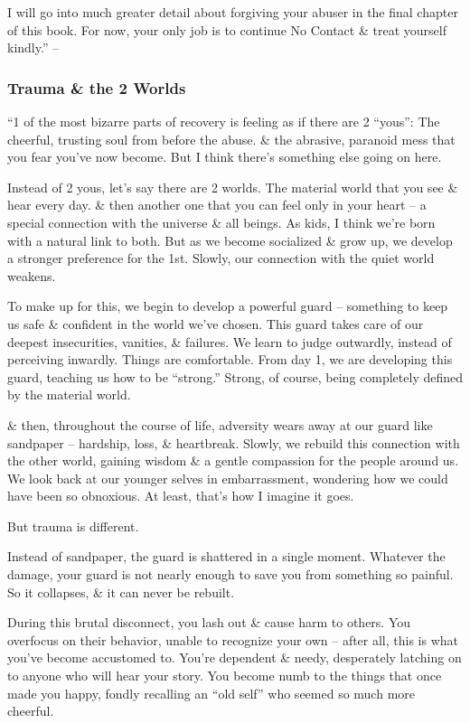 \documentclass{article}
\numberwithin{equation}{section}
\begin{document}
I will go into much greater detail about forgiving your abuser in the final chapter of this book. For now, your only job is to continue No Contact \& treat yourself kindly.'' -- \cite[pp. 133--134]{MacKenzie2015}

\subsubsection{Trauma \& the 2 Worlds}
``1 of the most bizarre parts of recovery is feeling as if there are 2 ``yous'': The cheerful, trusting soul from before the abuse. \& the abrasive, paranoid mess that you fear you've now become. But I think there's something else going on here.

Instead of 2 yous, let's say there are 2 worlds. The material world that you see \& hear every day. \& then another one that you can feel only in your heart -- a special connection with the universe \& all beings. As kids, I think we're born with a natural link to both. But as we become socialized \& grow up, we develop a stronger preference for the 1st. Slowly, our connection with the quiet world weakens.

To make up for this, we begin to develop a powerful guard -- something to keep us safe \& confident in the world we've chosen. This guard takes care of our deepest insecurities, vanities, \& failures. We learn to judge outwardly, instead of perceiving inwardly. Things are comfortable. From day 1, we are developing this guard, teaching us how to be ``strong.'' Strong, of course, being completely defined by the material world.

\& then, throughout the course of life, adversity wears away at our guard like sandpaper -- hardship, loss, \& heartbreak. Slowly, we rebuild this connection with the other world, gaining wisdom \& a gentle compassion for the people around us. We look back at our younger selves in embarrassment, wondering how we could have been so obnoxious. At least, that's how I imagine it goes.

But trauma is different.

Instead of sandpaper, the guard is shattered in a single moment. Whatever the damage, your guard is not nearly enough to save you from something so painful. So it collapses, \& it can never be rebuilt.

During this brutal disconnect, you lash out \& cause harm to others. You overfocus on their behavior, unable to recognize your own -- after all, this is what you've become accustomed to. You're dependent \& needy, desperately latching on to anyone who will hear your story. You become numb to the things that once made you happy, fondly recalling an ``old self'' who seemed so much more cheerful.
\end{document}
